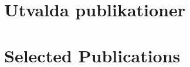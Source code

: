         \section{Utvalda publikationer}
    \else
        \section{Selected Publications}
    \fi
    \begin{refsection}
    	\vspace{2mm}
        \nocite{
        	GironsLopez2017,
        	GironsLopez2016a,
        	GironsLopez2015
        }
        \printbibliography[heading=none]
    \end{refsection}
\fi